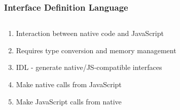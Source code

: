 \documentclass[
	notes=none,
	aspectratio=169
]{beamer}
\begin{document}

\begin{frame}
\frametitle{}

\begin{columns}[T]
\begin{column}[T]{0.5\textwidth}
\setlength{\parskip}{0.5em}

\vspace{0.5cm}





\end{column}
\begin{column}[T]{0.5\textwidth}
\setlength{\parskip}{0.5em}

\vspace{0.5cm}



\end{column}
\end{columns}

\end{frame}
\note{
\begin{enumerate}
\item -
\end{enumerate}
}


\begin{frame}
\frametitle{Interface Definition Language}

\begin{columns}[T]
\begin{column}[T]{1.0\textwidth}
\setlength{\parskip}{0.5em}

\vspace{0.8cm}
\begin{enumerate}
\setlength{\parskip}{0.5em}
\item Interaction between native code and JavaScript
\item Requires type conversion and memory management
\item IDL - generate native/JS-compatible interfaces
\item Make native calls from JavaScript
\item Make JavaScript calls from native
\end{enumerate}
\end{column}
\end{columns}

\end{frame}
\note{
\begin{enumerate}
\item -
\end{enumerate}
}
\end{document}
